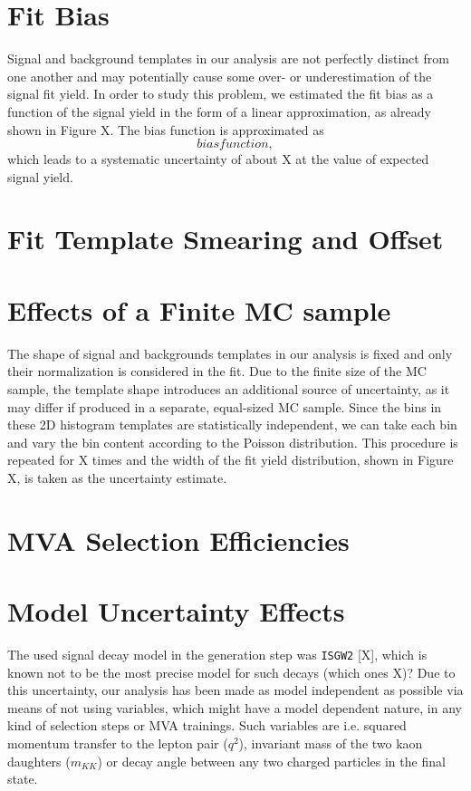\section{Fit Bias}
Signal and background templates in our analysis are not perfectly distinct from one another and may potentially cause some over- or underestimation of the signal fit yield. In order to study this problem, we estimated the fit bias as a function of the signal yield in the form of a linear approximation, as already shown in Figure X. The bias function is approximated as
\begin{equation}
bias function,
\end{equation}
which leads to a systematic uncertainty of about X at the value of expected signal yield.


\section{Fit Template Smearing and Offset}


\section{Effects of a Finite MC sample}
The shape of signal and backgrounds templates in our analysis is fixed and only their normalization is considered in the fit. Due to the finite size of the MC sample, the template shape introduces an additional source of uncertainty, as it may differ if produced in a separate, equal-sized MC sample. Since the bins in these 2D histogram templates are statistically independent, we can take each bin and vary the bin content according to the Poisson distribution. This procedure is repeated for X times and the width of the fit yield distribution, shown in Figure X, is taken as the uncertainty estimate.

\section{MVA Selection Efficiencies}


\section{Model Uncertainty Effects}
The used signal decay model in the generation step was \texttt{ISGW2} [X], which is known not to be the most precise model for such decays (which ones X)? Due to this uncertainty, our analysis has been made as model independent as possible via means of not using variables, which might have a model dependent nature, in any kind of selection steps or MVA trainings. Such variables are i.e. squared momentum transfer to the lepton pair ($q^2$), invariant mass of the two kaon daughters ($m_{KK}$) or decay angle between any two charged particles in the final state.

